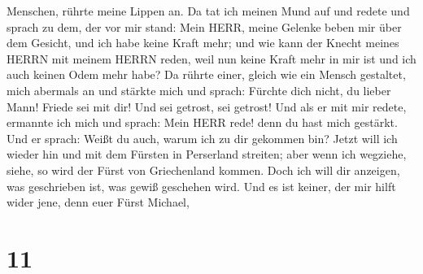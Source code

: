 Menschen, rührte meine Lippen an. Da tat ich meinen Mund auf und redete
und sprach zu dem, der vor mir stand: Mein HERR, meine Gelenke beben mir
über dem Gesicht, und ich habe keine Kraft mehr;  und wie
kann der Knecht meines HERRN mit meinem HERRN reden, weil nun keine
Kraft mehr in mir ist und ich auch keinen Odem mehr habe? 
Da rührte einer, gleich wie ein Mensch gestaltet, mich abermals an und
stärkte mich  und sprach: Fürchte dich nicht, du lieber
Mann! Friede sei mit dir! Und sei getrost, sei getrost! Und als er mit
mir redete, ermannte ich mich und sprach: Mein HERR rede! denn du hast
mich gestärkt.  Und er sprach: Weißt du auch, warum ich zu
dir gekommen bin? Jetzt will ich wieder hin und mit dem Fürsten in
Perserland streiten; aber wenn ich wegziehe, siehe, so wird der Fürst
von Griechenland kommen.  Doch ich will dir anzeigen, was
geschrieben ist, was gewiß geschehen wird. Und es ist keiner, der mir
hilft wider jene, denn euer Fürst Michael,

\hypertarget{section-10}{%
\section{11}\label{section-10}}

